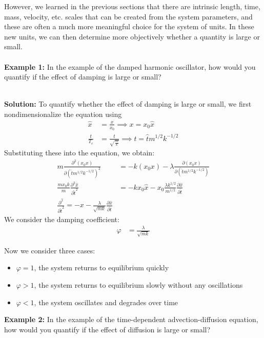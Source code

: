 However, we learned in the previous sections that there are intrinsic length, time, mass, velocity, etc. scales that can be created from the system parameters, and these are often a much more meaningful choice for the system of units. In these new units, we can then determine more objectively whether a quantity is large or small.
\\
\\
{\bf Example 1:} In the example of the damped harmonic oscillator, how would you quantify if the effect of damping is large or small? 
\\
\\
{\color{red} {\bf Solution:}
To quantify whether the effect of damping is large or small, we first nondimensionalize the equation using 
\begin{align*}
    \hat{x}&= \frac{x}{x_0} \implies x = x_0 \hat{x}\\
    \frac{t}{T_c}&= \frac{t}{\sqrt{\frac{m}{k}}} \implies t = \hat{t}m^{1/2}k^{-1/2}
\end{align*}
Substituting these into the equation, we obtain: 
\begin{align*}
    m\frac{\partial^2(x_0x)}{\partial(\hat{t}m^{1/2}k^{-1/2})^2} &= -k(x_0x)- \lambda \frac{\partial(x_0x)}{\partial(\hat{t}m^{1/2}k^{-1/2})}\\
    \frac{mx_0k}{m}\frac{\partial^2\hat{x}}{\partial \hat{t}^2} &= -k x_0\hat{x} - x_0\frac{\lambda k^{1/2}}{m^{1/2}}\frac{\partial \hat{x}}{\partial \hat{t}}\\
    \frac{\partial^\hat{x}}{\partial\hat{t}^2} = -x - \frac{\lambda}{\sqrt{mk}}\frac{\partial \hat{x}}{\partial \hat{t}}
\end{align*}
We consider the damping coefficient: 
\begin{align*}
    \varphi &= \frac{\lambda}{\sqrt{mk}}
\end{align*}

Now we consider three cases: 
\begin{itemize}
    \item $\varphi = 1$, the system returns to equilibrium quickly 
    \item $\varphi > 1$, the system returns to equilibrium slowly without any oscillations
    \item $\varphi < 1$, the system oscillates and degrades over time
\end{itemize}}
{\bf Example 2:} In the example of the time-dependent advection-diffusion equation, how would you quantify if the effect of diffusion is large or small? 
